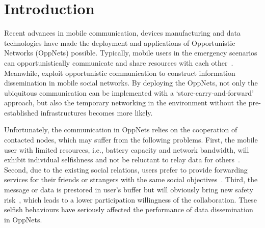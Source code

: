 \section{Introduction}
\label{sec:intro}
Recent advances in mobile communication,
devices manufacturing and data technologies have
made the deployment and applications of Opportunistic Networks
(OppNets) possible.
Typically,
mobile users in the emergency scenarios can
opportunistically communicate and share
resources with each other~\cite{DBLP:journals/tsc/KhalidKKZ14,
DBLP:journals/tmc/ChatzopoulosAKH18,
DBLP:journals/tmc/LiQJHW014}.
Meanwhile,
\cite{DBLP:journals/tmc/HanHKMSS12}
exploit opportunistic communication
to construct information
dissemination in mobile
social networks.
By deploying the OppNets,
not only the ubiquitous communication can be
implemented with a `store-carry-and-forward' approach,
but also the temporary networking
in the environment without the pre-established infrastructures
becomes more likely.

Unfortunately,
the communication in OppNets relies on
the cooperation of contacted nodes,
which may suffer from the following problems.
First,
the mobile user with limited resources,
i.e.,
battery capacity
and network bandwidth,
will exhibit individual selfishness and not be
reluctant to relay data for others~\cite{DBLP:journals/comsur/JedariXN18}.
Second,
due to the existing social relations,
users prefer to 
provide forwarding services for their friends or strangers 
with the same social objectives~\cite{DBLP:journals/tmc/HanHKMSS12}.
Third,
the message or data is prestored in user's buffer
but will obviously bring new safety risk~\cite{Saha2018Design},
which leads to a lower participation willingness of the collaboration.
These selfish behaviours have seriously 
affected the performance
of data dissemination in OppNets.



